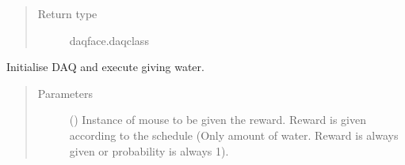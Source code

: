 \documentclass[letterpaper,10pt,english]{sphinxmanual}
\begin{document}
\begin{fulllineitems}
\begin{fulllineitems}
\begin{quote}
\begin{description}
\item[{Return type}] \leavevmode
\sphinxAtStartPar
daqface.daq\sphinxhyphen{}class

\end{description}\end{quote}

\end{fulllineitems}


\begin{fulllineitems}
\label{\detokenize{NoSeMazeController/Controllers:Controllers.ExperimentControl.ExperimentWorker.reward}}
\pysigstartsignatures
{}
\pysigstopsignatures
\sphinxAtStartPar
Initialise DAQ and execute giving water.
\begin{quote}\begin{description}
\item[{Parameters}] \leavevmode
\sphinxAtStartPar
{} () \textendash{} Instance of mouse to be given the reward. Reward is given according
to the schedule (Only amount of water. Reward is always given or
probability is always 1).

\end{description}\end{quote}

\end{fulllineitems}



\end{fulllineitems}
\end{document}
